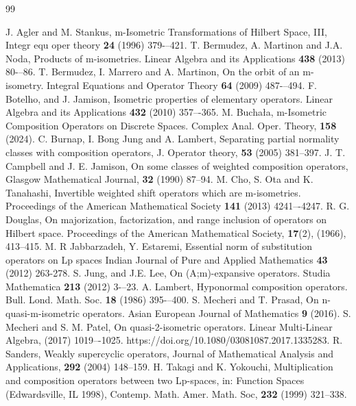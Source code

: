 \documentclass{amsart}
\theoremstyle{definition}\newtheorem{defn}[thm]{Definition}
\theoremstyle{remark}
\numberwithin{equation}{section}
\begin{document}
\begin{thebibliography}{99}

 J. Agler and M. Stankus, m-Isometric Transformations of Hilbert Space, III, Integr equ oper theory {\bf 24} (1996) 379-–421.
 T. Bermudez, A. Martinon and J.A. Noda, Products of m-isometries. Linear Algebra and its Applications {\bf 438} (2013) 80-–86.
 T. Bermudez, I. Marrero and A. Martinon, On the orbit of an m-isometry. Integral Equations and Operator Theory {\bf 64} (2009) 487-–494.
 F. Botelho, and J. Jamison,  Isometric properties of elementary operators. Linear Algebra and its Applications {\bf 432} (2010) 357–-365.
 M. Buchała, m-Isometric Composition Operators on Discrete Spaces. Complex Anal. Oper. Theory, {\bf 158} (2024).
 C. Burnap, I. Bong Jung and A. Lambert, Separating partial normality classes with composition operators, J. Operator theory, {\bf 53} (2005) 381--397.
 J. T. Campbell and J. E. Jamison, On some classes of weighted composition operators, Glasgow Mathematical Journal, {\bf32} (1990) 87--94.
 M. Cho, S. Ota and K. Tanahashi, Invertible weighted shift operators which are m-isometries.
Proceedings of the American Mathematical Society {\bf141} (2013) 4241–-4247.
R. G. Douglas, On majorization, factorization, and range inclusion of operators on Hilbert space. Proceedings of the American Mathematical Society, \textbf{17}(2), (1966), 413–415.
 M. R Jabbarzadeh, Y. Estaremi, Essential norm of substitution operators on Lp spaces
Indian Journal of Pure and Applied Mathematics {\bf43} (2012) 263-278.
 S. Jung, and J.E. Lee, On (A;m)-expansive operators. Studia Mathematica {\bf213} (2012) 3-–23.
 A. Lambert, Hyponormal composition operators. Bull. Lond. Math. Soc. {\bf 18} (1986) 395-–400.
 S. Mecheri and T. Prasad, On n-quasi-m-isometric operators. Asian European Journal of
Mathematics {\bf9} (2016).
 S. Mecheri and S. M. Patel, On quasi-2-isometric operators. Linear Multi-Linear Algebra, (2017) 1019–-1025. https://doi.org/10.1080/03081087.2017.1335283.
 R. Sanders, Weakly supercyclic operators, Journal of Mathematical Analysis and Applications, {\bf 292} (2004) 148--159.
 H. Takagi and K. Yokouchi, Multiplication and composition operators between two Lp-spaces, in: Function Spaces (Edwardsville, IL 1998), Contemp. Math. Amer. Math. Soc, {\bf 232} (1999) 321–338.

\end{thebibliography}
\end{document}
